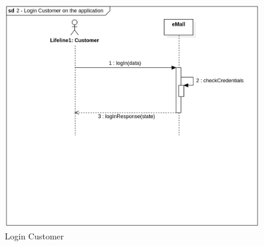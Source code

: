 \begin{figure}[H]
    \begin{center}
        \includegraphics[width=\textwidth]{img/sequence/login-cust.png}
        \caption{Login Customer}
    \end{center}
\end{figure}
